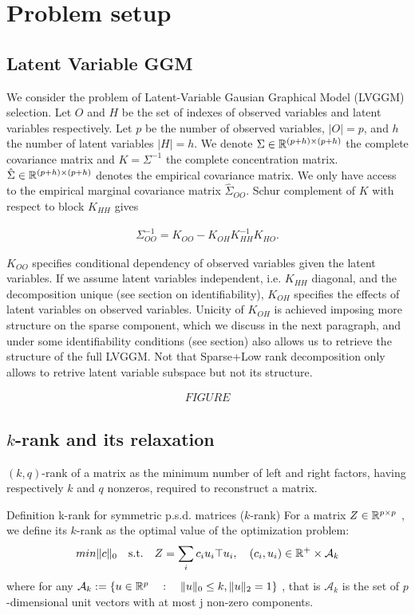 \section{Problem setup}
\label{setup}

\subsection{Latent Variable GGM}
We consider the problem of Latent-Variable Gausian Graphical Model (LVGGM) selection. Let $O$ and $H$ be the set of indexes of observed variables and latent variables respectively. Let $p$ be the number of observed variables, $|O|=p$, and  $h$ the number of latent variables $|H|=h$. We denote $\Sigma\in\mathbb{R}^{(p+h)\times(p+h)}$ the complete covariance matrix and $K=\Sigma^{-1}$ the complete concentration matrix. $\hat{\Sigma}\in\mathbb{R}^{(p+h)\times(p+h)}$ denotes the empirical covariance matrix. We only have access to the empirical marginal covariance matrix $\hat{\Sigma}_{OO}$. Schur complement of $K$ with respect to block $K_{HH}$ gives 

\begin{align}
\Sigma_{OO}^{-1} = K_{OO}-K_{OH}K_{HH}^{-1}K_{HO}.
\end{align}

$K_{OO}$ specifies conditional dependency of observed variables given the latent variables. If we assume latent variables independent, i.e. $K_{HH}$ diagonal, and the decomposition unique (see section on identifiability), $K_{OH}$ specifies the effects of latent variables on observed variables. Unicity of $K_{OH}$ is achieved imposing more structure on the sparse component, which we discuss in the next paragraph, and under some identifiability conditions (see section) also allows us to retrieve the structure of the full LVGGM. Not that Sparse+Low rank decomposition only allows to retrive latent variable subspace but not its structure.

\begin{align}
FIGURE
\end{align}

\subsection{$k$-rank and its relaxation}
$(k, q)$-rank of a matrix as the minimum number of left and right factors, having respectively $k$ and $q$ nonzeros, required to reconstruct a matrix. 

Definition k-rank for symmetric p.s.d. matrices
\mydef
($k$-rank) For a matrix $Z\in\mathbb{R}^{p\times p}$ , we define its $k$-rank as the optimal
value of the optimization problem:
\begin{align}
min \|c\|_0 \quad \text{s.t.} \quad Z=\sum_{i} c_i u_i{\top}u_i, \quad (c_i,u_i)\in \mathbb{R}^{+}\times\mathcal{A}_k
\end{align}
where for any  $\mathcal{A}_k:=\{u\in\mathbb{R}^p \quad : \quad  \|u\|_0 \leq k, \|u\|_2 = 1\}$ , that is $\mathcal{A}_k$ is the set of $p$-dimensional unit vectors with at most j non-zero components.



